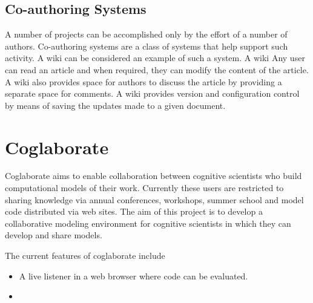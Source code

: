 
\subsection{Co-authoring Systems}

A number of projects can be accomplished only by the effort of a
number of authors. Co-authoring systems are a class of systems that
help support such activity. A wiki can be considered an example of
such a system. A wiki Any user can read an article and when required, they
can modify the content of the article. A wiki also provides space for
authors to discuss the article by providing a separate space for
comments. A wiki provides version and configuration control by means
of saving the updates made to a given document.

\section{Coglaborate}


Coglaborate aims to enable collaboration between cognitive scientists
who build computational models of their work. Currently these users
are restricted to sharing knowledge via annual conferences,
workshops, summer school and model code distributed via web sites. The
aim of this project is to develop a collaborative modeling environment
for cognitive scientists in which they can develop and share models. 



The current features of coglaborate include

\begin{itemize}
\item A live listener in a web browser where code can be evaluated.
\item 
\end{itemize}



 


